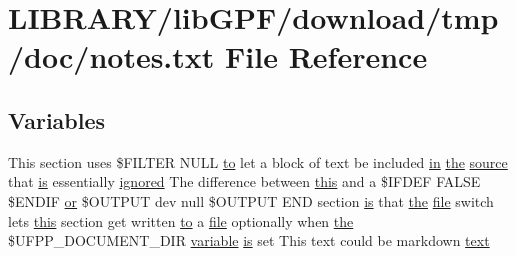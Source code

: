 \hypertarget{notes_8txt}{}\section{L\+I\+B\+R\+A\+R\+Y/lib\+G\+P\+F/download/tmp/doc/notes.txt File Reference}
\label{notes_8txt}
\subsection*{Variables}
\begin{DoxyCompactItemize}
\item 
This section uses \$F\+I\+L\+T\+ER N\+U\+LL \hyperlink{M__stopwatch_83_8txt_a97209fd3e34ef701c0a9734280779cbb}{to} let a block of text be included \hyperlink{M__journal_83_8txt_afce72651d1eed785a2132bee863b2f38}{in} \hyperlink{M__stopwatch_83_8txt_a0f266597de2e57eb3aa964927bb30e14}{the} \hyperlink{ufpp__overview_81_8txt_a4d6669ece605d05985c83a04dd38e0ad}{source} that \hyperlink{intro__blas1_83_8txt_a42a91df93f840595de3019ceb5d1df23}{is} essentially \hyperlink{ufpp__overview_81_8txt_a41b072d4e414a3fa706019354766d5a8}{ignored} The difference between \hyperlink{M__stopwatch_83_8txt_ad62a52042bb610eee5b36b5516caec22}{this} and a \$I\+F\+D\+EF F\+A\+L\+SE \$E\+N\+D\+IF \hyperlink{what__overview_81_8txt_a93f5d39a36ed511cc0dc88a20a517388}{or} \$O\+U\+T\+P\+UT dev null \$O\+U\+T\+P\+UT E\+ND section \hyperlink{intro__blas1_83_8txt_a42a91df93f840595de3019ceb5d1df23}{is} that \hyperlink{M__stopwatch_83_8txt_a0f266597de2e57eb3aa964927bb30e14}{the} \hyperlink{what__overview_81_8txt_a447b56c526e8da30e0dc94673727ee25}{file} switch lets \hyperlink{M__stopwatch_83_8txt_ad62a52042bb610eee5b36b5516caec22}{this} section get written \hyperlink{M__stopwatch_83_8txt_a97209fd3e34ef701c0a9734280779cbb}{to} a \hyperlink{what__overview_81_8txt_a447b56c526e8da30e0dc94673727ee25}{file} optionally when \hyperlink{M__stopwatch_83_8txt_a0f266597de2e57eb3aa964927bb30e14}{the} \$U\+F\+P\+P\+\_\+\+D\+O\+C\+U\+M\+E\+N\+T\+\_\+\+D\+IR \hyperlink{M__stopwatch_83_8txt_a2fa76741434e14a1b61bcbd4629b9cec}{variable} \hyperlink{intro__blas1_83_8txt_a42a91df93f840595de3019ceb5d1df23}{is} set This text could be markdown \hyperlink{notes_8txt_ad997a48ee1fbabed5333859846b5d9a3}{text}
\item 

\end{DoxyCompactItemize}
